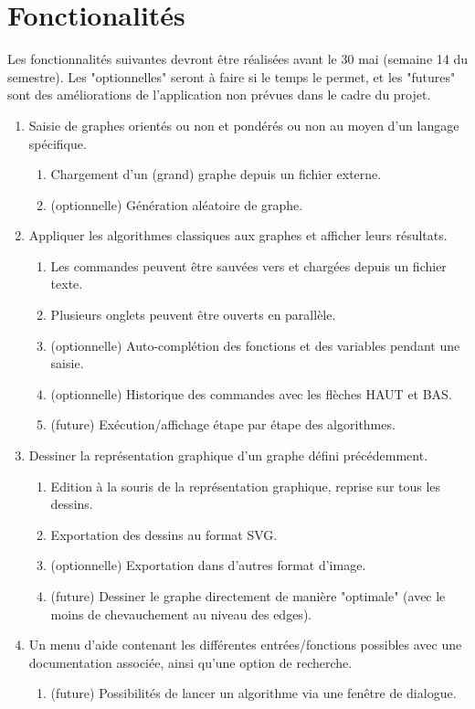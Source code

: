 \documentclass[french]{article}
\begin{document}
	\section{Fonctionalités}
		Les fonctionnalités suivantes devront être réalisées avant le 30 mai (semaine 14 du semestre). Les "optionnelles" seront à faire si le temps le permet, et les "futures" sont des améliorations de l'application non prévues dans le cadre du projet.
		\begin{enumerate}
			\item Saisie de graphes orientés ou non et pondérés ou non au moyen d'un langage spécifique.
			\begin{enumerate}
				\item Chargement d'un (grand) graphe depuis un fichier externe.
				\item (optionnelle) Génération aléatoire de graphe.
			\end{enumerate}
			
			\item Appliquer les algorithmes classiques aux graphes et afficher leurs résultats.
			\begin{enumerate}
				\item Les commandes peuvent être sauvées vers et chargées depuis un fichier texte.
				\item Plusieurs onglets peuvent être ouverts en parallèle.
				\item (optionnelle) Auto-complétion des fonctions et des variables pendant une saisie.
				\item (optionnelle) Historique des commandes avec les flèches HAUT et BAS.
				\item (future) Exécution/affichage étape par étape des algorithmes.
			\end{enumerate}
			
			\item Dessiner la représentation graphique d'un graphe défini précédemment.
			\begin{enumerate}
				\item Edition à la souris de la représentation graphique, reprise sur tous les dessins.
				\item Exportation des dessins au format SVG.
				\item (optionnelle) Exportation dans d'autres format d'image.
				\item (future) Dessiner le graphe directement de manière "optimale" (avec le moins de chevauchement au niveau des edges).
			\end{enumerate}
			
			\item Un menu d'aide contenant les différentes entrées/fonctions possibles avec une documentation associée, ainsi qu'une option de recherche.
			\begin{enumerate}
				\item (future) Possibilités de lancer un algorithme via une fenêtre de dialogue.
			\end{enumerate}
		\end{enumerate}
		
\end{document}

